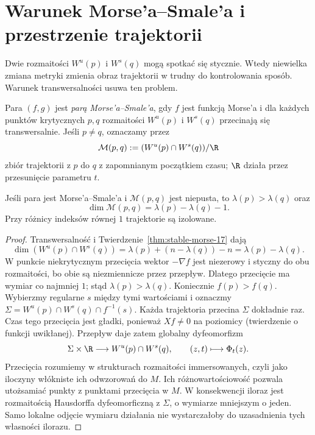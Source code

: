\section{Warunek Morse'a--Smale'a i przestrzenie trajektorii}
\label{sec:morse-smale-17}

Dwie rozmaitości $W^u(p)$ i $W^s(q)$
mogą spotkać się stycznie. Wtedy
niewielka zmiana metryki zmienia
obraz trajektorii w trudny do
kontrolowania sposób. Warunek
transwersalności usuwa ten problem.

\begin{definicja}
\label{def:ms-17}
Para $(f,g)$ jest \emph{parą Morse'a--Smale'a},
gdy $f$ jest funkcją Morse'a
i dla każdych punktów krytycznych
$p,q$ rozmaitości $W^u(p)$ i $W^s(q)$
przecinają się transwersalnie.
Jeśli $p\ne q$, oznaczamy przez
\[
 \mathcal M(p,q)
 :=(W^u(p)\cap W^s(q))/\R
\]
zbiór trajektorii z $p$ do $q$
z zapomnianym początkiem czasu;
$\R$ działa przez przesunięcie
parametru $t$.
\end{definicja}

\begin{stwierdzenie}
\label{prop:wymiar-ms-17}
Jeśli para jest Morse'a--Smale'a
i $\mathcal M(p,q)$ jest niepusta,
to $\lambda(p)>\lambda(q)$ oraz
\[
 \dim\mathcal M(p,q)
    =\lambda(p)-\lambda(q)-1.
\]
Przy różnicy indeksów równej $1$
trajektorie są izolowane.
\end{stwierdzenie}
\begin{proof}
Transwersalność i
Twierdzenie~\ref{thm:stable-morse-17}
dają
\[
 \dim(W^u(p)\cap W^s(q))
 =\lambda(p)+(n-\lambda(q))-n
 =\lambda(p)-\lambda(q).
\]
W punkcie niekrytycznym przecięcia
wektor $-\nabla f$ jest niezerowy
i styczny do obu rozmaitości,
bo obie są niezmiennicze
przez przepływ. Dlatego
przecięcie ma wymiar co
najmniej $1$; stąd
$\lambda(p)>\lambda(q)$.
Koniecznie $f(p)>f(q)$. Wybierzmy regularne
$s$ między tymi wartościami i oznaczmy
$\Sigma=W^u(p)\cap W^s(q)\cap f^{-1}(s)$.
Każda trajektoria przecina $\Sigma$ dokładnie raz.
Czas tego przecięcia jest gładki, ponieważ
$Xf\ne0$ na poziomicy (twierdzenie o funkcji uwikłanej).
Przepływ daje zatem globalny dyfeomorfizm
\[
 \Sigma\times\R\longrightarrow W^u(p)\cap W^s(q),
 \qquad (z,t)\longmapsto\Phi_t(z).
\]
Przecięcia rozumiemy w strukturach rozmaitości
immersowanych, czyli jako iloczyny włókniste ich
odwzorowań do $M$. Ich różnowartościowość pozwala
utożsamiać punkty z punktami przecięcia w $M$.
W konsekwencji iloraz jest rozmaitością Hausdorffa
dyfeomorficzną z $\Sigma$, o wymiarze mniejszym o jeden.
Samo lokalne odjęcie wymiaru działania nie
wystarczałoby do uzasadnienia tych własności ilorazu.
\end{proof}

